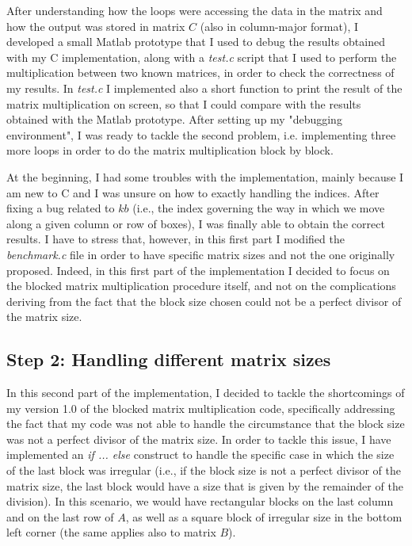 \documentclass[unicode,11pt,a4paper,oneside,numbers=endperiod,openany]{scrartcl}
\begin{document}
After understanding how the loops were accessing the data in the matrix and how the output was stored in matrix $C$ (also in column-major format), I developed a small Matlab prototype that I used to debug the results obtained with my C implementation, along with a \emph{test.c} script that I used to perform the multiplication between two known matrices, in order to check the correctness of my results. In \emph{test.c} I implemented also a short function to print the result of the matrix multiplication on screen, so that I could compare with the results obtained with the Matlab prototype. After setting up my "debugging environment", I was ready to tackle the second problem, i.e. implementing three more loops in order to do the matrix multiplication block by block.  

At the beginning, I had some troubles with the implementation, mainly because I am new to C and I was unsure on how to exactly handling the indices. After fixing a bug related to $kb$ (i.e., the index governing the way in which we move along a given column or row of boxes), I was finally able to obtain the correct results. I have to stress that, however, in this first part I modified the \emph{benchmark.c} file in order to have specific matrix sizes and not the one originally proposed. Indeed, in this first part of the implementation I decided to focus on the blocked matrix multiplication procedure itself, and not on the complications deriving from the fact that the block size chosen could not be a perfect divisor of the matrix size. 

\subsection{Step 2: Handling different matrix sizes}
In this second part of the implementation, I decided to tackle the shortcomings of my version 1.0 of the blocked matrix multiplication code, specifically addressing the fact that my code was not able to handle the circumstance that the block size was not a perfect divisor of the matrix size. In order to tackle this issue, I have implemented an \emph{if ... else} construct to handle the specific case in which the size of the last block was irregular (i.e., if the block size is not a perfect divisor of the matrix size, the last block would have a size that is given by the remainder of the division). In this scenario, we would have rectangular blocks on the last column and on the last row of $A$, as well as a square block of irregular size in the bottom left corner (the same applies also to matrix $B$).
\end{document}
